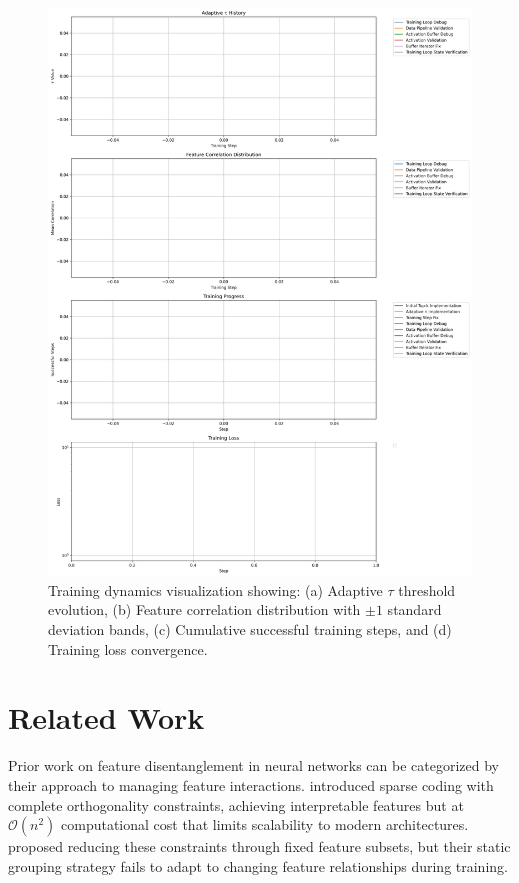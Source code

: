 \documentclass{article} %
\begin{document}
\begin{figure}[t]
    \centering
    \includegraphics[width=\textwidth]{training_comparison.png}
    \caption{Training dynamics visualization showing: (a) Adaptive $\tau$ threshold evolution, (b) Feature correlation distribution with $\pm1$ standard deviation bands, (c) Cumulative successful training steps, and (d) Training loss convergence.}
    \label{fig:training_comparison}
\end{figure}

\section{Related Work}
\label{sec:related}

Prior work on feature disentanglement in neural networks can be categorized by their approach to managing feature interactions. \cite{Olshausen1996EmergenceOS} introduced sparse coding with complete orthogonality constraints, achieving interpretable features but at $\mathcal{O}(n^2)$ computational cost that limits scalability to modern architectures. \cite{Bergstra2011TheSI} proposed reducing these constraints through fixed feature subsets, but their static grouping strategy fails to adapt to changing feature relationships during training.
\end{document}
